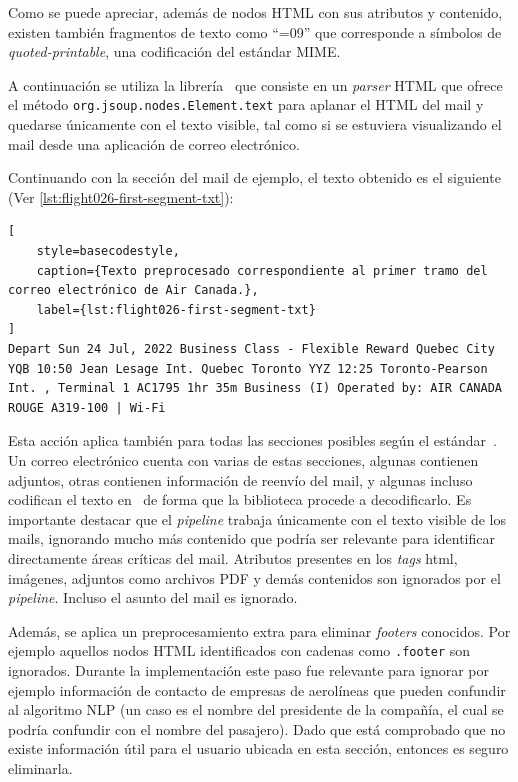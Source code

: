 Como se puede apreciar, además de nodos HTML con sus atributos y contenido, existen también fragmentos de texto como
``=09'' que corresponde a símbolos de \textit{quoted-printable}, una codificación del estándar MIME\@.

A continuación se utiliza la librería~\cite{jsoup} que consiste en un \textit{parser} HTML que
ofrece el método \texttt{org.jsoup.nodes.Element.text} para aplanar el HTML del mail y quedarse únicamente con el
texto visible, tal como si se estuviera visualizando el mail desde una aplicación de correo electrónico.

Continuando con la sección del mail de ejemplo, el texto obtenido es el siguiente (Ver \autoref{lst:flight026-first-segment-txt}):

\begin{lstlisting}[
    style=basecodestyle,
    caption={Texto preprocesado correspondiente al primer tramo del correo electrónico de Air Canada.},
    label={lst:flight026-first-segment-txt}
]
Depart Sun 24 Jul, 2022 Business Class - Flexible Reward Quebec City YQB 10:50 Jean Lesage Int. Quebec Toronto YYZ 12:25 Toronto-Pearson Int. , Terminal 1 AC1795 1hr 35m Business (I) Operated by: AIR CANADA ROUGE A319-100 | Wi-Fi
\end{lstlisting}

Esta acción aplica también para todas las secciones posibles según el estándar~\cite{mime-wikipedia}.
Un correo electrónico cuenta con varias de estas secciones, algunas contienen adjuntos, otras contienen información de
reenvío del mail, y algunas incluso codifican el texto en~\cite{base64-wikipedia} de forma
que la biblioteca procede a decodificarlo.
Es importante destacar que el \textit{pipeline} trabaja únicamente con el texto visible de los mails, ignorando mucho
más contenido que podría ser relevante para identificar directamente áreas críticas del mail.
Atributos presentes en los \textit{tags} html, imágenes, adjuntos como archivos PDF y demás contenidos son ignorados
por el \textit{pipeline}.
Incluso el asunto del mail es ignorado.

Además, se aplica un preprocesamiento extra para eliminar \textit{footers} conocidos.
Por ejemplo aquellos nodos HTML identificados con cadenas como \texttt{.footer} son ignorados.
Durante la implementación este paso fue relevante para ignorar por ejemplo información de contacto de empresas de
aerolíneas que pueden confundir al algoritmo NLP (un caso es el nombre del presidente de la compañía, el cual se podría
confundir con el nombre del pasajero).
Dado que está comprobado que no existe información útil para el usuario ubicada en esta sección, entonces es seguro
eliminarla.

